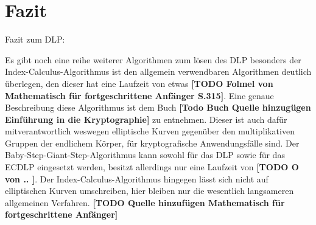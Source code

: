 \section{Fazit}
	Fazit zum DLP:
	
	Es gibt noch eine reihe weiterer Algorithmen zum lösen des DLP besonders der Index-Calculus-Algorithmus ist den allgemein verwendbaren Algorithmen deutlich überlegen, den dieser hat eine Laufzeit von etwas \textbf{[TODO Folmel von Mathematisch für fortgeschrittene Anfänger S.315]}. Eine genaue Beschreibung diese Algorithmus ist dem Buch \textbf{[Todo Buch Quelle hinzugügen Einführung in die Kryptographie]} zu entnehmen. Dieser ist auch dafür mitverantwortlich weswegen elliptische Kurven gegenüber den multiplikativen Gruppen der endlichem Körper, für kryptografische Anwendungsfälle  sind. Der Baby-Step-Giant-Step-Algorithmus kann sowohl für das DLP sowie für das ECDLP eingesetzt werden, besitzt allerdings nur eine Laufzeit von \textbf{[TODO O von .. ]}. Der Index-Calculus-Algorithmus hingegen lässt sich nicht auf elliptischen Kurven umschreiben, hier bleiben nur die wesentlich langsameren allgemeinen Verfahren. \textbf{[TODO Quelle hinzufügen Mathematisch für fortgeschrittene Anfänger]}